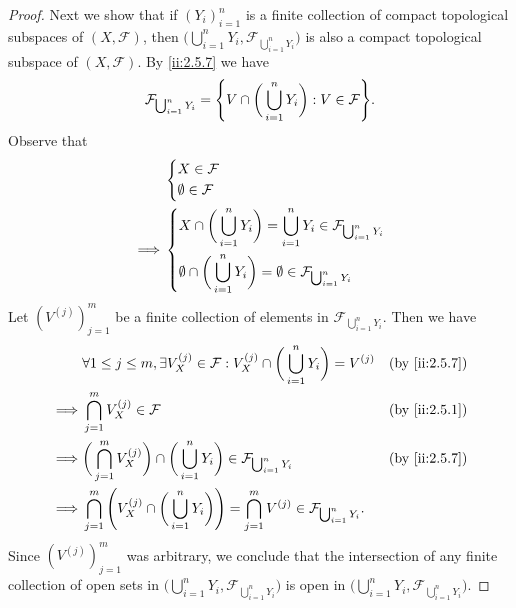 \begin{proof}
  Next we show that if \((Y_i)_{i = 1}^n\) is a finite collection of compact topological subspaces of \((X, \mathcal{F})\), then \(\big(\bigcup_{i = 1}^n Y_i, \mathcal{F}_{\bigcup_{i = 1}^n Y_i}\big)\) is also a compact topological subspace of \((X, \mathcal{F})\).
  By \cref{ii:2.5.7} we have
  \[
    \mathcal{F}_{\bigcup_{i = 1}^n Y_i} = \set{V \cap \bigg(\bigcup_{i = 1}^n Y_i\bigg) : V \in \mathcal{F}}.
  \]
  Observe that
  \begin{align*}
             & \begin{dcases}
                 X \in \mathcal{F} \\
                 \emptyset \in \mathcal{F}
               \end{dcases}                                                                                 \\
    \implies & \begin{dcases}
                 X \cap \bigg(\bigcup_{i = 1}^n Y_i\bigg) = \bigcup_{i = 1}^n Y_i \in \mathcal{F}_{\bigcup_{i = 1}^n Y_i} \\
                 \emptyset \cap \bigg(\bigcup_{i = 1}^n Y_i\bigg) = \emptyset \in \mathcal{F}_{\bigcup_{i = 1}^n Y_i}
               \end{dcases}
  \end{align*}
  Let \((V^{(j)})_{j = 1}^m\) be a finite collection of elements in \(\mathcal{F}_{\bigcup_{i = 1}^n Y_i}\).
  Then we have
  \begin{align*}
             & \forall 1 \leq j \leq m, \exists V_X^{(j)} \in \mathcal{F} : V_X^{(j)} \cap \bigg(\bigcup_{i = 1}^n Y_i\bigg) = V^{(j)}                             &  & \by{ii:2.5.7} \\
    \implies & \bigcap_{j = 1}^m V_X^{(j)} \in \mathcal{F}                                                                                                         &  & \by{ii:2.5.1} \\
    \implies & \bigg(\bigcap_{j = 1}^m V_X^{(j)}\bigg) \cap \bigg(\bigcup_{i = 1}^n Y_i\bigg) \in \mathcal{F}_{\bigcup_{i = 1}^n Y_i}                              &  & \by{ii:2.5.7} \\
    \implies & \bigcap_{j = 1}^m \Bigg(V_X^{(j)} \cap \bigg(\bigcup_{i = 1}^n Y_i\bigg)\Bigg) = \bigcap_{j = 1}^m V^{(j)} \in \mathcal{F}_{\bigcup_{i = 1}^n Y_i}.
  \end{align*}
  Since \((V^{(j)})_{j = 1}^m\) was arbitrary, we conclude that the intersection of any finite collection of open sets in \(\big(\bigcup_{i = 1}^n Y_i, \mathcal{F}_{\bigcup_{i = 1}^n Y_i}\big)\) is open in \(\big(\bigcup_{i = 1}^n Y_i, \mathcal{F}_{\bigcup_{i = 1}^n Y_i}\big)\).

\end{proof}
